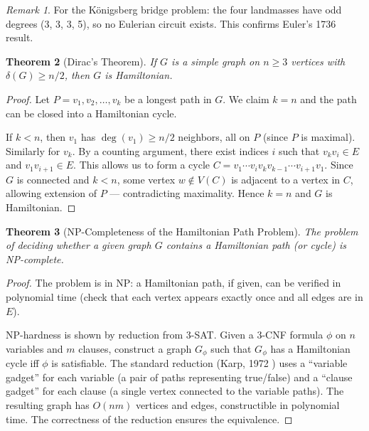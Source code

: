 \documentclass[12pt,a4paper]{amsart}
\newtheorem{theorem}{Theorem}[section]
\theoremstyle{definition}
\theoremstyle{remark}
\newtheorem{remark}[theorem]{Remark}
\begin{document}
\begin{remark}
For the K\"{o}nigsberg bridge problem: the four landmasses have odd degrees
(3, 3, 3, 5), so no Eulerian circuit exists. This confirms Euler's 1736 result.
\end{remark}

\begin{theorem}[Dirac's Theorem]
\label{thm:dirac}
If $G$ is a simple graph on $n \ge 3$ vertices with $\delta(G) \ge n/2$,
then $G$ is Hamiltonian.
\end{theorem}

\begin{proof}
Let $P = v_1, v_2, \ldots, v_k$ be a longest path in $G$. We claim $k = n$
and the path can be closed into a Hamiltonian cycle.

If $k < n$, then $v_1$ has $\deg(v_1) \ge n/2$ neighbors, all on $P$ (since
$P$ is maximal). Similarly for $v_k$. By a counting argument, there exist
indices $i$ such that $v_k v_i \in E$ and $v_1 v_{i+1} \in E$. This allows
us to form a cycle $C = v_1 \cdots v_i v_k v_{k-1} \cdots v_{i+1} v_1$.
Since $G$ is connected and $k < n$, some vertex $w \notin V(C)$ is adjacent
to a vertex in $C$, allowing extension of $P$ — contradicting maximality.
Hence $k = n$ and $G$ is Hamiltonian.
\end{proof}

\begin{theorem}[NP-Completeness of the Hamiltonian Path Problem]
\label{thm:ham-np}
The problem of deciding whether a given graph $G$ contains a Hamiltonian path
(or cycle) is NP-complete.
\end{theorem}

\begin{proof}
The problem is in NP: a Hamiltonian path, if given, can be verified in
polynomial time (check that each vertex appears exactly once and all edges
are in $E$).

NP-hardness is shown by reduction from 3-SAT. Given a 3-CNF formula
$\phi$ on $n$ variables and $m$ clauses, construct a graph $G_\phi$ such
that $G_\phi$ has a Hamiltonian cycle iff $\phi$ is satisfiable. The standard
reduction (Karp, 1972 \cite{karp1972}) uses a ``variable gadget'' for each
variable (a pair of paths representing true/false) and a ``clause gadget''
for each clause (a single vertex connected to the variable paths). The
resulting graph has $O(nm)$ vertices and edges, constructible in polynomial
time. The correctness of the reduction ensures the equivalence.
\end{proof}
\end{document}

